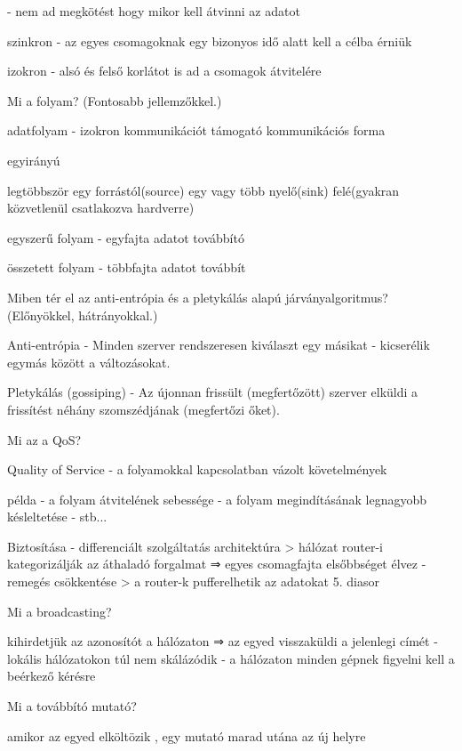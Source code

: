 \documentclass[12pt]{article}
\begin{document}
\begin{description}[style=unboxed]
        - nem ad megkötést hogy mikor kell átvinni az adatot
    \item szinkron
        - az egyes csomagoknak egy bizonyos idő alatt kell a célba érniük
    \item izokron 
        - alsó és felső korlátot is ad a csomagok átvitelére
    \item  Mi a folyam? (Fontosabb jellemzőkkel.)
    \item adatfolyam
        - izokron kommunikációt támogató kommunikációs forma
    \item egyirányú
    \item legtöbbször egy forrástól(source) egy vagy több nyelő(sink) felé(gyakran közvetlenül csatlakozva hardverre)
    \item egyszerű folyam
        - egyfajta adatot továbbító
    \item összetett folyam
        - többfajta adatot továbbít
    \item  Miben tér el az anti-entrópia és a pletykálás alapú járványalgoritmus? (Előnyökkel, hátrányokkal.)
    \item Anti-entrópia
        - Minden szerver rendszeresen kiválaszt egy másikat
        - kicserélik egymás között a változásokat.
    \item Pletykálás (gossiping)
        - Az újonnan frissült (megfertőzött) szerver elküldi a frissítést néhány szomszédjának (megfertőzi őket).
    \item  Mi az a QoS?
    \item Quality of Service 
        - a folyamokkal kapcsolatban vázolt követelmények
    \item példa
        - a folyam átvitelének sebessége
        - a folyam megindításának legnagyobb késleltetése
        - stb...
    \item Biztosítása
        - differenciált szolgáltatás architektúra
        > hálózat router-i kategorizálják az áthaladó forgalmat 
        ⇒ egyes csomagfajta elsőbbséget élvez
        - remegés csökkentése
        > a router-k pufferelhetik az adatokat
        5. diasor
    \item  Mi a broadcasting?
    \item kihirdetjük az azonosítót a hálózaton ⇒ az egyed visszaküldi a jelenlegi címét
        - lokális hálózatokon túl nem skálázódik
        - a hálózaton minden gépnek figyelni kell a beérkező kérésre 
    \item  Mi a továbbító mutató?
    \item amikor az egyed elköltözik , egy mutató marad utána az új helyre

\end{description}
\end{document}
